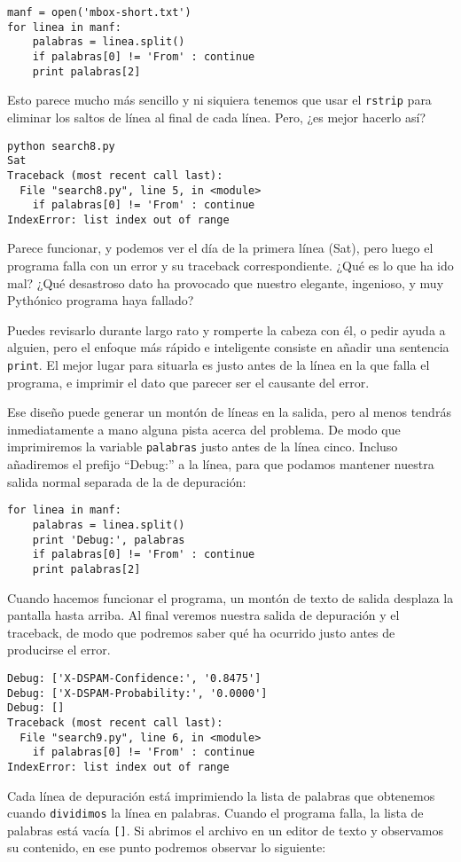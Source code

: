 \begin{enumerate}
\beforeverb
\begin{verbatim}
manf = open('mbox-short.txt')
for linea in manf:
    palabras = linea.split()
    if palabras[0] != 'From' : continue
    print palabras[2]
\end{verbatim}
\afterverb
%
Esto parece mucho más sencillo y ni siquiera tenemos que usar el
{\tt rstrip} para eliminar los saltos de línea al final de cada línea.
Pero, ¿es mejor hacerlo así?

\beforeverb
\begin{verbatim}
python search8.py 
Sat
Traceback (most recent call last):
  File "search8.py", line 5, in <module>
    if palabras[0] != 'From' : continue
IndexError: list index out of range
\end{verbatim}
\afterverb
%
Parece funcionar, y podemos ver el día de la primera línea
(Sat), pero luego el programa falla con un error y su traceback correspondiente.
¿Qué es lo que ha ido mal? ¿Qué desastroso dato ha provocado que nuestro elegante,
ingenioso, y muy Pythónico programa haya fallado?

Puedes revisarlo durante largo rato y romperte la cabeza
con él, o pedir ayuda a alguien, pero el enfoque más
rápido e inteligente consiste en añadir una sentencia {\tt print}. El mejor lugar
para situarla es justo antes de la línea en la que
falla el programa, e imprimir el dato que parecer ser el causante
del error.

Ese diseño puede generar un montón de líneas en la salida, pero
al menos tendrás inmediatamente a mano alguna pista acerca
del problema. De modo que imprimiremos la variable
{\tt palabras} justo antes de la línea cinco. Incluso
añadiremos el prefijo ``Debug:'' a la línea, para que
podamos mantener nuestra salida normal separada de la de depuración:

\beforeverb
\begin{verbatim}
for linea in manf:
    palabras = linea.split()
    print 'Debug:', palabras
    if palabras[0] != 'From' : continue
    print palabras[2]
\end{verbatim}
\afterverb
%
Cuando hacemos funcionar el programa, un montón de texto de salida
desplaza la pantalla hasta arriba. Al final veremos nuestra salida
de depuración y el traceback, de modo que podremos saber qué
ha ocurrido justo antes de producirse el error.

\beforeverb
\begin{verbatim}
Debug: ['X-DSPAM-Confidence:', '0.8475']
Debug: ['X-DSPAM-Probability:', '0.0000']
Debug: []
Traceback (most recent call last):
  File "search9.py", line 6, in <module>
    if palabras[0] != 'From' : continue
IndexError: list index out of range
\end{verbatim}
\afterverb
%
Cada línea de depuración está imprimiendo la lista de palabras que obtenemos
cuando {\tt dividimos} la línea en palabras. Cuando el programa falla,
la lista de palabras está vacía \verb"[]". Si abrimos el archivo en un
editor de texto y observamos su contenido, en ese punto podremos observar
lo siguiente:


\end{enumerate}

